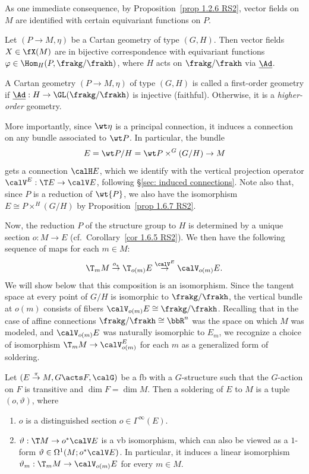 As one immediate consequence, by Proposition~\ref{prop 1.2.6 RS2}, vector fields on $M$ are identified with certain equivariant functions on $P$.
\begin{cor}
    Let $(P\to M,\eta)$ be a Cartan geometry of type $(G,H)$. Then vector fields $X\in \fX(M)$ are in bijective correspondence with equivariant functions $\varphi\in\Hom_H(P,\frakg\slash\frakh)$, where $H$ acts on $\frakg\slash\frakh$ via $\underline{\Ad}$.
\end{cor}

\begin{defn}
    A Cartan geometry $(P\to M,\eta)$ of type $(G,H)$ is called a first-order geometry if $\underline{\Ad}:H\to \GL(\frakg\slash\frakh)$ is injective (faithful). Otherwise, it is a \emph{higher-order} geometry.
\end{defn}

More importantly, since $\wt\eta$ is a principal connection, it induces a connection on any bundle associated to $\wt P$. In particular, the bundle 
\[E=\wt P\slash H=\wt P\times^G (G\slash H)\to M\] gets a connection $\calH E$, which we identify with the vertical projection operator $\calV^E:\T E\to \calV E$, following \S\ref{sec: induced connections}. 
Note also that, since $P$ is a reduction of $\wt{P}$, we also have the isomorphism $E\cong P\times^H (G\slash H)$ by Proposition~\ref{prop 1.6.7 RS2}.

Now, the reduction $P$ of the structure group to $H$ is determined by a unique section $o:M\to E$ (cf.\ Corollary~\ref{cor 1.6.5 RS2}). We then have the following sequence of maps for each $m\in M$:
\[\T_mM\overset{o_{\ast}}{\to}\T_{o(m)}E\overset{\calV^E}{\to}\calV_{o(m)}E.\]
We will show below that this composition is an isomorphism. Since the tangent space at every point of $G\slash H$ is isomorphic to $\frakg\slash\frakh$, the vertical bundle at $o(m)$ consists of fibers $\calV_{o(m)}E\cong \frakg\slash\frakh$.  Recalling that in the case of affine connections $\frakg\slash\frakh\cong\bbR^n$ was the space on which $M$ was modeled, and $\calV_{o(m)}E$ was naturally isomorphic to $E_m$, we recognize a choice of isomorphism $\T_mM\to \calV^E_{o(m)}$ for each $m$ as a generalized form of soldering.

\begin{defn}\label{def soldering of E to M}
    Let $(E\overset{\pi}{\to}M,G\acts F,\calG)$ be a \gls{fb} with a $G$-structure such that the $G$-action on $F$ is transitive and $\dim F=\dim M$. Then a soldering of $E$ to $M$ is a tuple $(o,\vartheta)$, where
    \begin{enumerate}
        \item $o$ is a distinguished section $o\in\Gamma^\infty(E)$.
        \item $\vartheta:\T M\to o^\ast\calV E$ is a \gls{vb} isomorphism, which can also be viewed as a $1$-form $\vartheta\in \Omega^1(M;o^\ast \calV E)$. In particular, it induces a linear isomorphism $\vartheta_m:\T_m M\to \calV_{o(m)}E$ for every $m\in M$.
    \end{enumerate}
\end{defn}

